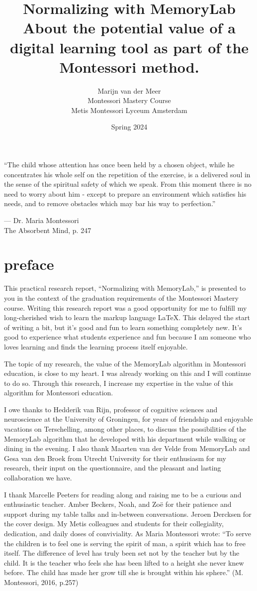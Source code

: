 \documentclass[12pt, a4paper]{article}
\title{Normalizing with MemoryLab\\ \large About the potential value of a digital learning tool as part of the Montessori method.}
\author{Marijn van der Meer\\ Montessori Mastery Course \\ Metis Montessori Lyceum Amsterdam}
\date{Spring 2024}
\begin{document}
\maketitle
\thispagestyle{empty}
\pagebreak
\thispagestyle{empty}
\tableofcontents
\pagebreak
\thispagestyle{empty}
\epigraph{“The child whose attention has once been held by a chosen object, while he concentrates his whole self on the repetition of the exercise, is a delivered soul in the sense of the spiritual safety of which we speak. From this moment there is no need to worry about him - except to prepare an environment which satisfies his needs, and to remove obstacles which may bar his way to perfection.”}{--- \textup{Dr. Maria Montessori}\\ The Absorbent Mind, p. 247}
\pagebreak

\section*{preface}

This practical research report, “Normalizing with MemoryLab,” is presented to you in the context of the graduation requirements of the Montessori Mastery course. Writing this research report was a good opportunity for me to fulfill my long-cherished wish to learn the markup language LaTeX. This delayed the start of writing a bit, but it’s good and fun to learn something completely new. It’s good to experience what students experience and fun because I am someone who loves learning and finds the learning process itself enjoyable.

The topic of my research, the value of the MemoryLab algorithm in Montessori education, is close to my heart. I was already working on this and I will continue to do so. Through this research, I increase my expertise in the value of this algorithm for Montessori education.

I owe thanks to Hedderik van Rijn, professor of cognitive sciences and neuroscience at the University of Groningen, for years of friendship and enjoyable vacations on Terschelling, among other places, to discuss the possibilities of the MemoryLab algorithm that he developed with his department while walking or dining in the evening. I also thank Maarten van der Velde from MemoryLab and Gesa van den Broek from Utrecht University for their enthusiasm for my research, their input on the questionnaire, and the pleasant and lasting collaboration we have.

I thank Marcelle Peeters for reading along and raising me to be a curious and enthusiastic teacher. Amber Beckers, Noah, and Zoë for their patience and support during my table talks and in-between conversations. Jeroen Dercksen for the cover design. My Metis colleagues and students for their collegiality, dedication, and daily doses of conviviality. As Maria Montessori wrote: “To serve the children is to feel one is serving the spirit of man, a spirit which has to free itself. The difference of level has truly been set not by the teacher but by the child. It is the teacher who feels she has been lifted to a height she never knew before. The child has made her grow till she is brought within his sphere.” (M. Montessori, 2016, p.257)
\end{document}
